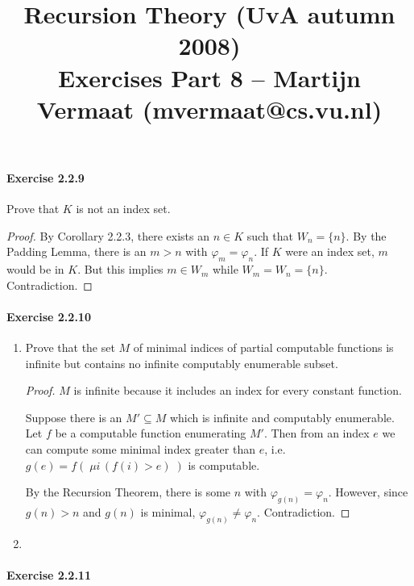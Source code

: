 \documentclass[a4paper,11pt]{article}
\title{Recursion Theory (UvA autumn 2008)\\
\normalsize{Exercises Part 8 -- Martijn Vermaat (mvermaat@cs.vu.nl)}}
\date{}
\begin{document}
\maketitle


\paragraph{Exercise 2.2.9}

Prove that $K$ is not an index set.

\begin{proof}
By Corollary 2.2.3, there exists an $n \in K$ such that $W_n = \{n\}$.
By the Padding Lemma, there is an $m > n$ with $\varphi_m = \varphi_n$.
If $K$ were an index set, $m$ would be in $K$.
But this implies $m \in W_m$ while $W_m = W_n = \{n\}$.
Contradiction.
\end{proof}


\paragraph{Exercise 2.2.10}

\begin{enumerate}[label=(\alph*)]

\item
Prove that the set $M$ of minimal indices of partial computable functions
is infinite but contains no infinite computably enumerable subset.

\begin{proof}
$M$ is infinite because it includes an index for every constant function.

Suppose there is an $M' \subseteq M$ which is infinite and computably enumerable.
Let $f$ be a computable function enumerating $M'$.
Then from an index $e$ we can compute some minimal index greater than $e$, i.e.
$g(e) = f( \; \mu i \, (f(i) > e) \; )$ is computable.

By the Recursion Theorem, there is some $n$ with $\varphi_{g(n)} = \varphi_n$.
However, since $g(n) > n$ and $g(n)$ is minimal, $\varphi_{g(n)} \neq \varphi_n$.
Contradiction.
\end{proof}

\item

\end{enumerate}


\paragraph{Exercise 2.2.11}
\end{document}
